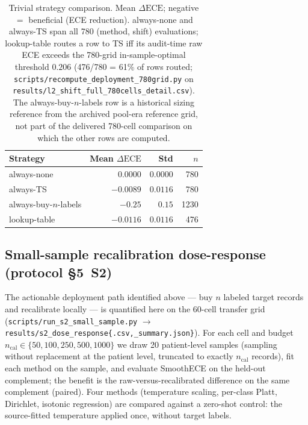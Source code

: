 \documentclass[final,5p,times,nonatbib]{elsarticle}
\begin{document}
\begin{table}[t]
\centering
\caption{Trivial strategy comparison. Mean $\Delta\text{ECE}$; negative $=$
beneficial (ECE reduction). always-none and always-TS span all 780
(method, shift) evaluations; lookup-table routes a row to TS iff its
audit-time raw ECE exceeds the 780-grid in-sample-optimal threshold
$0.206$ (476/780 = 61\% of rows routed;
\texttt{scripts/recompute\_deployment\_780grid.py} on
\texttt{results/l2\_shift\_full\_780cells\_detail.csv}). The
always-buy-$n$-labels row is a historical sizing reference from the
archived pool-era reference grid, not part of the delivered 780-cell
comparison on which the other rows are computed.}
\label{tab:trivial}
\begin{tabular}{lrrr}
\toprule
Strategy & Mean $\Delta\text{ECE}$ & Std & $n$ \\
\midrule
always-none            & $\phantom{-}0.0000$  & $0.0000$ & 780 \\
always-TS              & $-0.0089$            & $0.0116$ & 780  \\
always-buy-$n$-labels  & $-0.25$              & $0.15$ & 1230 \\
lookup-table           & $-0.0116$            & $0.0116$ & 476  \\
\bottomrule
\end{tabular}
\end{table}

\subsection{Small-sample recalibration dose-response (protocol \S5~S2)}
\label{sec:s2}
The actionable deployment path identified above --- buy $n$ labeled
target records and recalibrate locally --- is quantified here on the
60-cell transfer grid (\texttt{scripts/run\_s2\_small\_sample.py}
$\rightarrow$ \texttt{results/s2\_dose\_response\{.csv,\_summary.json\}}).
For each cell and budget $n_{\text{cal}}\in\{50,100,250,500,1000\}$ we
draw 20 patient-level samples (sampling without replacement at the
patient level, truncated to exactly $n_{\text{cal}}$ records), fit each
method on the sample, and evaluate SmoothECE on the held-out complement;
the benefit is the raw-versus-recalibrated difference on the same
complement (paired). Four methods (temperature scaling, per-class
Platt, Dirichlet, isotonic regression) are compared against a zero-shot
control: the source-fitted temperature applied once, without target
labels.
\end{document}
